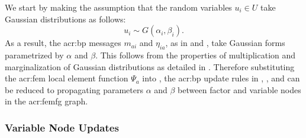 We start by making the assumption that the random variables $u_i \in U$ take Gaussian distributions as follows:
\begin{equation}
	u_i  \sim G(\alpha_i,\beta_i) \label{eqn:vndis}.
\end{equation}
As a result, the \gls{acr:bp} messages $m_{ai}$ and $\eta_{ia}$, as in  and , take Gaussian forms parametrized by $\alpha$ and $\beta$.
This follows from the properties of multiplication and marginalization of Gaussian distributions as detailed in .
Therefore substituting the \gls{acr:fem} local element function $\Psi_a$  into , the \gls{acr:bp} update rules in , , and  can be reduced to propagating parameters $\alpha$ and $\beta$ between factor and variable nodes in the \gls{acr:femfg} graph.



\subsubsection{Variable Node Updates}


